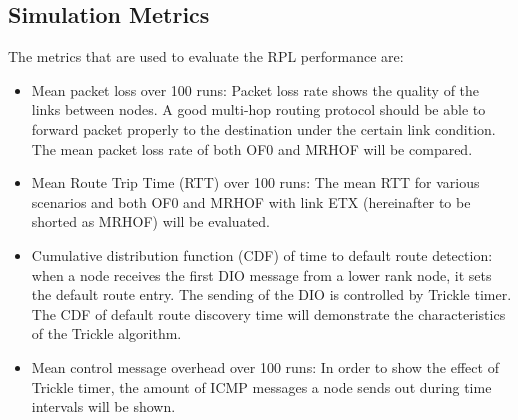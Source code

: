 \subsection{Simulation Metrics}
\label{Sim:metrics}
The metrics that are used to evaluate the RPL performance are:
\begin{itemize}
\item Mean packet loss over 100 runs: Packet loss rate shows the quality of the links between nodes. A good multi-hop routing protocol should be able to forward packet properly to the destination under the certain link condition. The mean packet loss rate of both OF0 and MRHOF will be compared.
\newline

\item Mean Route Trip Time (RTT) over 100 runs: The mean RTT for various scenarios and both OF0 and MRHOF with link ETX (hereinafter to be shorted as MRHOF) will be evaluated.
\newline

\item Cumulative distribution function (CDF) of time to default route detection: when a node receives the first DIO message from a lower rank node, it sets the default route entry. The sending of the DIO is controlled by Trickle timer. The CDF of default route discovery time will demonstrate the characteristics of the Trickle algorithm.
\newline

\item Mean control message overhead over 100 runs: In order to show the effect of Trickle timer, the amount of ICMP messages a node sends out during time intervals will be shown.
\end{itemize}








